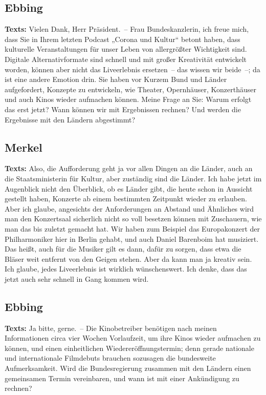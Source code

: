 \documentclass{article}
\begin{document}
\subsection{Ebbing}
\noindent\textbf{Texts:} Vielen Dank, Herr Präsident. – Frau Bundeskanzlerin, ich freue mich, dass Sie in Ihrem letzten Podcast „Corona und Kultur“ betont haben, dass kulturelle Veranstaltungen für unser Leben von allergrößter Wichtigkeit sind. Digitale Alternativformate sind schnell und mit großer Kreativität entwickelt worden, können aber nicht das Liveerlebnis ersetzen – das wissen wir beide –; da ist eine andere Emotion drin. Sie haben vor Kurzem Bund und Länder aufgefordert, Konzepte zu entwickeln, wie Theater, Opernhäuser, Konzerthäuser und auch Kinos wieder aufmachen können. Meine Frage an Sie: Warum erfolgt das erst jetzt? Wann können wir mit Ergebnissen rechnen? Und werden die Ergebnisse mit den Ländern abgestimmt?

\subsection{Merkel}
\noindent\textbf{Texts:} Also, die Aufforderung geht ja vor allen Dingen an die Länder, auch an die Staatsministerin für Kultur, aber zuständig sind die Länder. Ich habe jetzt im Augenblick nicht den Überblick, ob es Länder gibt, die heute schon in Aussicht gestellt haben, Konzerte ab einem bestimmten Zeitpunkt wieder zu erlauben. Aber ich glaube, angesichts der Anforderungen an Abstand und Ähnliches wird man den Konzertsaal sicherlich nicht so voll besetzen können mit Zuschauern, wie man das bis zuletzt gemacht hat. Wir haben zum Beispiel das Europakonzert der Philharmoniker hier in Berlin gehabt, und auch Daniel Barenboim hat musiziert. Das heißt, auch für die Musiker gilt es dann, dafür zu sorgen, dass etwa die Bläser weit entfernt von den Geigen stehen. Aber da kann man ja kreativ sein. Ich glaube, jedes Liveerlebnis ist wirklich wünschenswert. Ich denke, dass das jetzt auch sehr schnell in Gang kommen wird.

\subsection{Ebbing}
\noindent\textbf{Texts:} Ja bitte, gerne. – Die Kinobetreiber benötigen nach meinen Informationen circa vier Wochen Vorlaufzeit, um ihre Kinos wieder aufmachen zu können, und einen einheitlichen Wiedereröffnungstermin; denn gerade nationale und internationale Filmdebuts brauchen sozusagen die bundesweite Aufmerksamkeit. Wird die Bundesregierung zusammen mit den Ländern einen gemeinsamen Termin vereinbaren, und wann ist mit einer Ankündigung zu rechnen?
\end{document}
